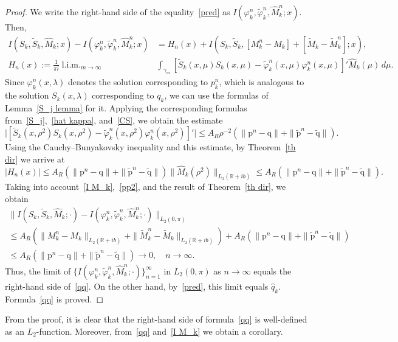 \documentclass[a4paper, 12pt] {article}
\theoremstyle{plain}
\theoremstyle{remark}
\theoremstyle{plain}
\theoremstyle{definition}
\numberwithin{equation}{section}
\begin{document}
\begin{proof}
We write the right-hand side of the equality~\eqref{pred} as $I(\varphi_k^n, \tilde\varphi_k^n, \hat M^n_k; x).$ Then,
\begin{equation} \begin{split}
I(S_k, \tilde S_k, \hat M_k; x) - I(\varphi_k^n, \tilde\varphi_k^n, \hat M^n_k; x) &= H_n(x) +  I(S_k, \tilde S_k,[M^n_k - {M_k}] + [\tilde M_k - \tilde M^n_k]; x), \\
H_n(x) := \frac{1}{\pi i} \mathop{l.i.m.}_{m \to \infty} &\mathop{\int}_{\gamma_m} [\tilde S_k(x, \mu) S_k(x, \mu)-\tilde \varphi^n_k(x, \mu) \varphi^n_k(x, \mu) ]'\hat M_k(\mu)\,d\mu.
\end{split} \label{pp2}
\end{equation}
Since $\varphi_k^n(x, \lambda)$ denotes the solution corresponding to $p_k^n$, which is analogous to the solution $S_k(x, \lambda)$ corresponding to $q_k$, we can use the formulas of Lemma~\ref{S_j lemma} for it. Applying the corresponding formulas from~\eqref{S_j},~\eqref{hat kappa}, and~\eqref{CS}, we obtain the estimate
$$\big|[\tilde S_k(x, \rho^2) S_k(x, \rho^2)-\tilde \varphi^n_k(x, \rho^2) \varphi^n_k(x, \rho^2)]'\big| \le A_R \rho^{-2} (\|\mathrm{p}^n - \mathrm{q} \| + \|\tilde{\mathrm{p}}^n - \tilde{\mathrm{q}} \|).$$
Using the Cauchy--Bunyakovsky inequality and this estimate, by Theorem~\ref{th dir} we arrive at
$$|H_n(x)|\le A_R (\|\mathrm{p}^n - \mathrm{q} \| + \|\tilde{\mathrm{p}}^n - \tilde{\mathrm{q}} \|)\big\| \hat M_k(\rho^2) \big\|_{L_2(\mathbb R + ib)} \le A_R (\|\mathrm{p}^n - \mathrm{q} \| + \|\tilde{\mathrm{p}}^n - \tilde{\mathrm{q}} \|).$$
Taking into account~\eqref{I M_k},~\eqref{pp2}, and the result of Theorem~\ref{th dir}, we obtain
\begin{equation*}
\begin{split}
\| I(S_k, \tilde S_k, \hat M_k; \cdot) - I(\varphi_k^n, \tilde\varphi_k^n, \hat M^n_k; \cdot)\|_{L_2(0, \pi)} \\
\le  A_R(\| M^n_k  -  M_k\|_{L_2(\mathbb R + ib)}  +\| \tilde M^n_k  -  \tilde M_k \|_{L_2(\mathbb R + ib)})
+A_R (\|\mathrm{p}^n - \mathrm{q} \| + \|\tilde{\mathrm{p}}^n - \tilde{\mathrm{q}} \|) \\
\le  
A_R (\|\mathrm{p}^n - \mathrm{q} \| + \|\tilde{\mathrm{p}}^n - \tilde{\mathrm{q}} \|) \to 0, \quad n \to \infty.
\end{split}
\end{equation*}
Thus, the limit of $\big\{ I(\varphi_k^n, \tilde\varphi_k^n, \hat M^n_k; \cdot) \big\}_{n=1}^\infty$ in $L_2(0, \pi)$ as $n \to \infty$ equals the right-hand side of~\eqref{qq}. On the other hand, by~\eqref{pred}, this limit equals $\hat q_k.$ Formula~\eqref{qq} is proved.
\end{proof}
From the proof, it is clear that the right-hand side of formula~\eqref{qq} is well-defined as an $L_2$-function. Moreover, from~\eqref{qq} and~\eqref{I M_k} we obtain a corollary.
\end{document}
